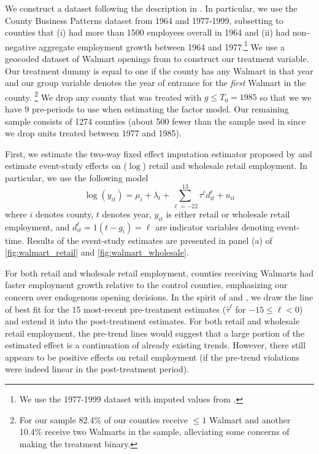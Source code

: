 \documentclass[12pt]{article}
\begin{document}
We construct a dataset following the description in \citet{basker2005job}. In particular, we use the County Business Patterns dataset from 1964 and 1977-1999, subsetting to counties that (i) had more than 1500 employees overall in 1964 and (ii) had non-negative aggregate employment growth between 1964 and 1977.\footnote{We use the 1977-1999 dataset with imputed values from \citet{eckert2021imputing}.} We use a geocoded dataset of Walmart openings from \citet{arcidiacono2020competitive} to construct our treatment variable. Our treatment dummy is equal to one if the county has any Walmart in that year and our group variable denotes the year of entrance for the \emph{first} Walmart in the county. \footnote{For our sample 82.4\% of our counties receive $\leq 1$ Walmart and another 10.4\% receive two Walmarts in the sample, alleviating some concerns of making the treatment binary.} We drop any county that was treated with $g \leq T_0 = 1985$ so that we we have 9 pre-periods to use when estimating the factor model. Our remaining sample consists of 1274 counties (about 500 fewer than the sample used in \citet{basker2005job} since we drop units treated between 1977 and 1985).

First, we estimate the two-way fixed effect imputation estimator proposed by \citet{Borusyak_Jaravel_Spiess_2021} and estimate event-study effects on ($\log$) retail and wholesale retail employment. In particular, we use the following model
\begin{equation}\label{eq:Walmart_twfe}
  \log(y_{it}) = \mu_i + \lambda_t + \sum_{\ell=-22}^{13} \tau^\ell d_{it}^\ell + u_{it}
\end{equation}
where $i$ denotes county, $t$ denotes year, $y_{it}$ is either retail or wholesale retail employment, and $d_{it}^\ell = 1(t - g_i) = \ell$ are indicator variables denoting event-time. Results of the event-study estimates are presented in panel (a) of \autoref{fig:walmart_retail} and \autoref{fig:walmart_wholesale}.

For both retail and wholesale retail employment, counties receiving Walmarts had faster employment growth relative to the control counties, emphasizing our concern over endogenous opening decisions. In the spirit of \citet{Freyaldenhoven_Hansen_Perez_Shapiro_2022} and \citet{rambachan2023more}, we draw the line of best fit for the 15 most-recent pre-treatment estimates ($\hat{\tau}^\ell$ for $-15 \leq \ell < 0$) and extend it into the post-treatment estimates. For both retail and wholesale retail employment, the pre-trend lines would suggest that a large portion of the estimated effect is a continuation of already existing trends. However, there still appears to be positive effects on retail employment (if the pre-trend violations were indeed linear in the post-treatment period). 
\end{document}
